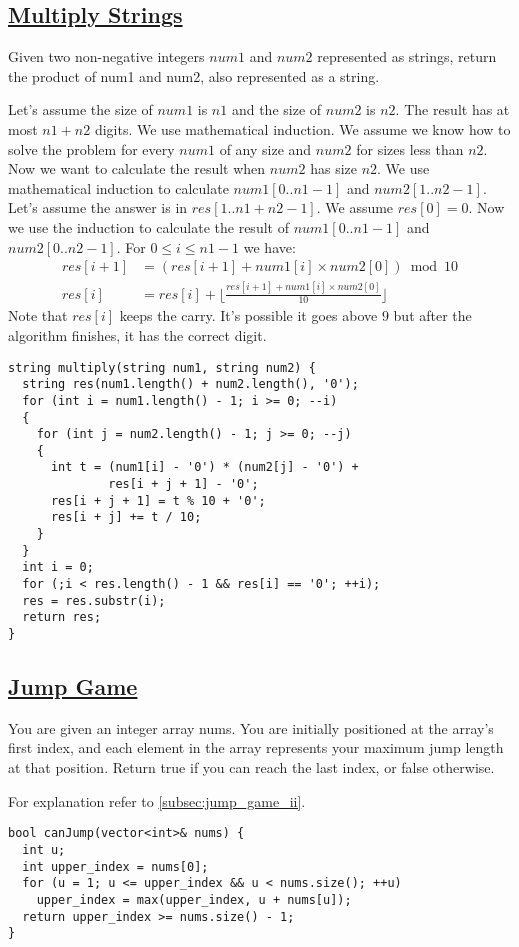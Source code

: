 \documentclass{book}
\begin{document}
	\subsection{\href{https://leetcode.com/problems/multiply-strings/}{Multiply Strings}}
	Given two non-negative integers $num1$ and $num2$ represented as strings, return the product of num1 and num2, also represented as a string.
	\par Let's assume the size of $num1$ is $n1$ and the size of $num2$ is $n2$. The result has at most $n1 + n2$ digits. We use mathematical induction. We assume we know how to solve the problem for every $num1$ of any size and $num2$ for sizes less than $n2$. Now we want to calculate the result when $num2$ has size $n2$. We use mathematical induction to calculate $num1[0..n1 - 1]$ and $num2[1..n2 - 1]$. Let's assume the answer is in $res[1..n1 + n2 - 1]$. We assume $res[0] = 0$. Now we use the induction to calculate the result of $num1[0..n1 - 1]$ and $num2[0..n2 - 1]$. For $0 \le i \le n1 - 1$ we have:
	\begin{equation*}
		\begin{split}
			res[i + 1] &= (res[i + 1] + num1[i] \times num2[0]) \bmod 10 \\
			res[i] &= res[i] + \lfloor \frac{res[i + 1] + num1[i] \times num2[0]}{10} \rfloor 
		\end{split}
	\end{equation*}
	Note that $res[i]$ keeps the carry. It's possible it goes above $9$ but after the algorithm finishes, it has the correct digit.
	\begin{lstlisting}
string multiply(string num1, string num2) {
  string res(num1.length() + num2.length(), '0');
  for (int i = num1.length() - 1; i >= 0; --i)
  {
    for (int j = num2.length() - 1; j >= 0; --j)
    {
      int t = (num1[i] - '0') * (num2[j] - '0') + 
              res[i + j + 1] - '0';
      res[i + j + 1] = t % 10 + '0';
      res[i + j] += t / 10;
    }
  }
  int i = 0;
  for (;i < res.length() - 1 && res[i] == '0'; ++i);
  res = res.substr(i);
  return res;
}
	\end{lstlisting}
	\subsection{\href{https://leetcode.com/problems/jump-game/}{Jump Game}}
	You are given an integer array nums. You are initially positioned at the array's first index, and each element in the array represents your maximum jump length at that position.	Return true if you can reach the last index, or false otherwise.
	\par For explanation refer to \ref{subsec:jump_game_ii}.
	\begin{lstlisting}
bool canJump(vector<int>& nums) {
  int u;
  int upper_index = nums[0];
  for (u = 1; u <= upper_index && u < nums.size(); ++u)
    upper_index = max(upper_index, u + nums[u]);
  return upper_index >= nums.size() - 1;
}
	\end{lstlisting}
\end{document}
